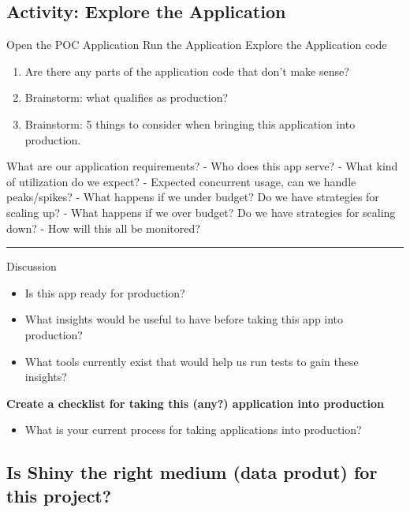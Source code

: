 \documentclass[]{book}
\providecommand{\tightlist}{%
  \setlength{\itemsep}{0pt}\setlength{\parskip}{0pt}}
\begin{document}
\hypertarget{activity-explore-the-application}{%
\subsection{Activity: Explore the
Application}\label{activity-explore-the-application}}

Open the POC Application Run the Application Explore the Application
code

\begin{enumerate}
\def\labelenumi{\arabic{enumi}.}
\tightlist
\item
  Are there any parts of the application code that don't make sense?
\item
  Brainstorm: what qualifies as production?
\item
  Brainstorm: 5 things to consider when bringing this application into
  production.
\end{enumerate}

What are our application requirements? - Who does this app serve? - What
kind of utilization do we expect? - Expected concurrent usage, can we
handle peaks/spikes? - What happens if we under budget? Do we have
strategies for scaling up? - What happens if we over budget? Do we have
strategies for scaling down? - How will this all be monitored?

\begin{center}\rule{0.5\linewidth}{\linethickness}\end{center}

Discussion

\begin{itemize}
\tightlist
\item
  Is this app ready for production?
\item
  What insights would be useful to have before taking this app into
  production?
\item
  What tools currently exist that would help us run tests to gain these
  insights?
\end{itemize}

\textbf{Create a checklist for taking this (any?) application into
production}

\begin{itemize}
\tightlist
\item
  What is your current process for taking applications into production?
\end{itemize}

\hypertarget{is-shiny-the-right-medium-data-produt-for-this-project}{%
\subsection{Is Shiny the right medium (data produt) for this
project?}\label{is-shiny-the-right-medium-data-produt-for-this-project}}
\end{document}
